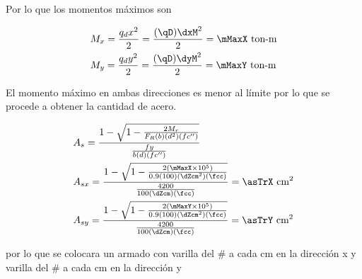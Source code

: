 \documentclass[11pt,a4paper,fleqn]{article}
\begin{document}
Por lo que los momentos máximos son

\begin{align*}
	&M_x=\frac{q_d x^2}{2}=\frac{(\qD)\dxM^2}{2}= \mMaxX \text{ ton-m} \\
	&M_y=\frac{q_d y^2}{2}=\frac{(\qD)\dyM^2}{2}= \mMaxY \text{ ton-m} 
\end{align*}

El momento máximo en ambas direcciones es menor al límite por lo que se procede a obtener la cantidad de acero.


\begin{align*}
	&A_s=\frac{1-\sqrt{1-\frac{2M_r}{F_R(b)(d^2)(fc'')}}}{\frac{fy}{b(d)(fc'')}}\\
	&A_{sx}=\frac{1-\sqrt{1-\frac{2(\mMaxX\times 10^5)}{0.9(100)(\dZcm^2)(\fcc)}}}{\frac{\fy}{100(\dZcm)(\fcc)}}=\asTrX \text{ cm$^2$}\\
	&A_{sy}=\frac{1-\sqrt{1-\frac{2(\mMaxY\times 10^5)}{0.9(100)(\dZcm^2)(\fcc)}}}{\frac{\fy}{100(\dZcm)(\fcc)}}=\asTrY \text{ cm$^2$}
\end {align*}

por lo que se colocara un armado con varilla del \# \VarX \; a cada \distVarX \;cm en la dirección x y varilla del \# \VarY \;a cada \distVarY \;cm en la dirección y
\end{document}
